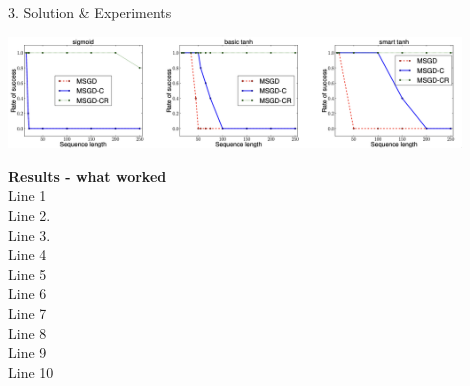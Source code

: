 \begin{frame}[t]
\begin{columns}[t,totalwidth=\textwidth]
\begin{column}{0.33\textwidth}
\begin{block}{3. Solution \& Experiments}
  \vspace{0.5cm}
\begin{center}
  \includegraphics[width=0.9\textwidth]{figures/results.png}
\end{center}
 \vspace{0.5cm}

  \textbf{Results - what worked } \\
  Line 1 \\
  Line 2. \\
  Line 3. \\
  Line 4 \\
  Line 5 \\
  Line 6\\
  Line 7\\
  Line 8 \\
  Line 9\\
  Line 10

    \end{block}

    \vspace{1em}
  

\end{column}
\end{columns}
\end{frame}
